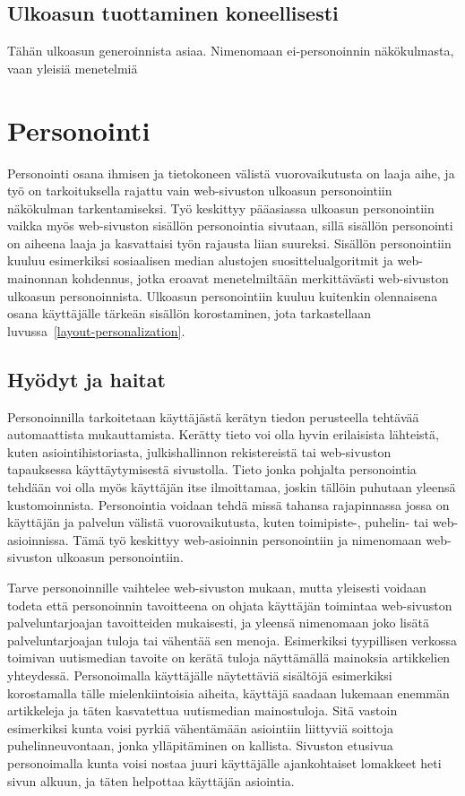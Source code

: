 \documentclass[finnish, 12pt, a4paper, elec, utf8, a-1b, online]{aaltothesis}
\begin{document}
\subsection{Ulkoasun tuottaminen koneellisesti}

Tähän ulkoasun generoinnista asiaa. Nimenomaan ei-personoinnin näkökulmasta,
vaan yleisiä menetelmiä

\clearpage

\section{Personointi}

Personointi osana ihmisen ja tietokoneen välistä vuorovaikutusta on laaja aihe,
ja työ on tarkoituksella rajattu vain web-sivuston ulkoasun personointiin
näkökulman tarkentamiseksi. Työ keskittyy pääasiassa ulkoasun personointiin
vaikka myös web-sivuston sisällön personointia sivutaan, sillä sisällön
personointi on aiheena laaja ja kasvattaisi työn rajausta liian suureksi.
Sisällön personointiin kuuluu esimerkiksi sosiaalisen median alustojen
suosittelualgoritmit ja web-mainonnan kohdennus, jotka eroavat menetelmiltään
merkittävästi web-sivuston ulkoasun personoinnista. Ulkoasun personointiin
kuuluu kuitenkin olennaisena osana käyttäjälle tärkeän sisällön korostaminen,
jota tarkastellaan luvussa~\ref{layout-personalization}.

\subsection{Hyödyt ja haitat}

Personoinnilla tarkoitetaan käyttäjästä kerätyn tiedon perusteella tehtävää
automaattista mukauttamista. Kerätty tieto voi olla hyvin erilaisista lähteistä,
kuten asiointihistoriasta, julkishallinnon rekistereistä tai web-sivuston
tapauksessa käyttäytymisestä sivustolla. Tieto jonka pohjalta personointia
tehdään voi olla myös käyttäjän itse ilmoittamaa, joskin tällöin puhutaan
yleensä kustomoinnista. Personointia voidaan tehdä missä tahansa rajapinnassa
jossa on käyttäjän ja palvelun välistä vuorovaikutusta, kuten toimipiste-,
puhelin- tai web-asioinnissa. Tämä työ keskittyy web-asioinnin personointiin
ja nimenomaan web-sivuston ulkoasun personointiin.

Tarve personoinnille vaihtelee web-sivuston mukaan, mutta yleisesti voidaan
todeta että personoinnin tavoitteena on ohjata käyttäjän toimintaa web-sivuston
palveluntarjoajan tavoitteiden mukaisesti, ja yleensä nimenomaan joko lisätä
palveluntarjoajan tuloja tai vähentää sen menoja. Esimerkiksi tyypillisen
verkossa toimivan uutismedian tavoite on kerätä tuloja näyttämällä mainoksia
artikkelien yhteydessä. Personoimalla käyttäjälle näytettäviä sisältöjä
esimerkiksi korostamalla tälle mielenkiintoisia aiheita, käyttäjä saadaan
lukemaan enemmän artikkeleja ja täten kasvatettua uutismedian mainostuloja. Sitä
vastoin esimerkiksi kunta voisi pyrkiä vähentämään asiointiin liittyviä soittoja
puhelinneuvontaan, jonka ylläpitäminen on kallista. Sivuston etusivua
personoimalla kunta voisi nostaa juuri käyttäjälle ajankohtaiset lomakkeet heti
sivun alkuun, ja täten helpottaa käyttäjän asiointia.
\end{document}
